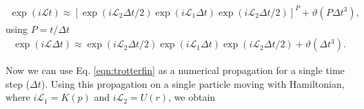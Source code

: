 \documentclass[
	12pt,				%
	openany,			%
	oneside,			%
	a4paper,			%
	english,			%
	brazil				%
	]{abntex2}
\providecommand{\DIFaddbegin}{}
\providecommand{\DIFaddend}{}
\providecommand{\DIFdelbegin}{}
\providecommand{\DIFdelend}{}
\providecommand{\DIFaddbegin}{} %
\providecommand{\DIFaddend}{} %
\providecommand{\DIFdelbegin}{} %
\providecommand{\DIFdelend}{} %
\begin{document}
\begin{equation}
\DIFdelbegin %
\DIFdelend \DIFaddbegin \begin{aligned}
\exp (i\mathcal{L}t)  \approx
\left [ \exp (i\mathcal{L}_{2} \Delta t/2) \exp (i\mathcal{L}_{1} \Delta t) \exp (i\mathcal{L}_{2} \Delta t/2) \right ]^{P} + \vartheta (P \Delta t^{3}),
\end{aligned}
\DIFaddend \end{equation}
using $P= t/\Delta t$
\begin{equation}
\DIFdelbegin %
\DIFdelend \DIFaddbegin \begin{aligned}
\exp (i\mathcal{L} \Delta t)  \approx
\exp (i\mathcal{L}_{2} \Delta t/2) \exp (i\mathcal{L}_{1} \Delta t) \exp (i\mathcal{L}_{2} \Delta t/2)  + \vartheta (\Delta t^{3}).
\end{aligned}
\DIFaddend \label{eqn:trotterfin}
\end{equation}  

Now we can use Eq. \ref{eqn:trotterfin} as a numerical propagation for a single time step ($\Delta t$). Using this propagation on a single particle moving with Hamiltonian, where $i\mathcal{L}_{1} = K (p)$ and $i\mathcal{L}_{2} = U (r)$, we obtain
\end{document}

